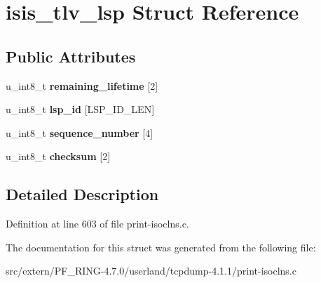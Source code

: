 \hypertarget{structisis__tlv__lsp}{
\section{isis\_\-tlv\_\-lsp Struct Reference}
\label{structisis__tlv__lsp}
}
\subsection*{Public Attributes}
\begin{DoxyCompactItemize}
\item 
\hypertarget{structisis__tlv__lsp_a694658a1669748c4566b06cf6598d936}{
u\_\-int8\_\-t {\bfseries remaining\_\-lifetime} \mbox{[}2\mbox{]}}
\label{structisis__tlv__lsp_a694658a1669748c4566b06cf6598d936}

\item 
\hypertarget{structisis__tlv__lsp_a4ca0a5381b7c44966b488ee8afb96c6d}{
u\_\-int8\_\-t {\bfseries lsp\_\-id} \mbox{[}LSP\_\-ID\_\-LEN\mbox{]}}
\label{structisis__tlv__lsp_a4ca0a5381b7c44966b488ee8afb96c6d}

\item 
\hypertarget{structisis__tlv__lsp_a45a3beea32d9748d710bfc5f627c14e9}{
u\_\-int8\_\-t {\bfseries sequence\_\-number} \mbox{[}4\mbox{]}}
\label{structisis__tlv__lsp_a45a3beea32d9748d710bfc5f627c14e9}

\item 
\hypertarget{structisis__tlv__lsp_a8f45c4cecd23d4fe9eff33c2e7544687}{
u\_\-int8\_\-t {\bfseries checksum} \mbox{[}2\mbox{]}}
\label{structisis__tlv__lsp_a8f45c4cecd23d4fe9eff33c2e7544687}

\end{DoxyCompactItemize}


\subsection{Detailed Description}


Definition at line 603 of file print-\/isoclns.c.



The documentation for this struct was generated from the following file:\begin{DoxyCompactItemize}
\item 
src/extern/PF\_\-RING-\/4.7.0/userland/tcpdump-\/4.1.1/print-\/isoclns.c\end{DoxyCompactItemize}
